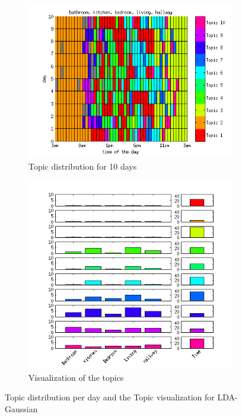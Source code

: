 \documentclass[a4paper,fleqn]{article}
\begin{document}
\begin{figure}[h!]
 \centering
 \begin{subfigure}[b]{0.45\linewidth}
  \centering
  \includegraphics[width=\textwidth]{Pictures/PoisDayHN2TS48k20.png}
  \caption{Topic distribution for 10 days}
 \end{subfigure}
 \begin{subfigure}[b]{0.45\linewidth}
  \centering
  \includegraphics[width=\textwidth]{Pictures/PoisTopHN2TS48k20.png}
  \caption{Visualization of the topics}
  \label{fig:PoisTopVisu48}
 \end{subfigure}
 \caption{Topic distribution per day and the Topic visualization for LDA-Gaussian}
 \label{fig:Pois48}
\end{figure}
\end{document}
